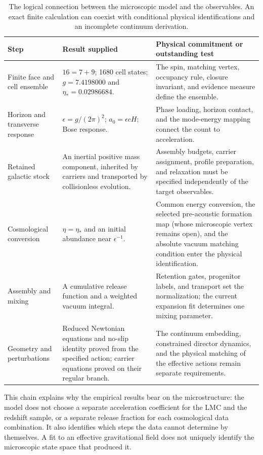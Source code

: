 \begin{table}[htbp]
\small
\begin{tabularx}{\textwidth}{P{.24\textwidth}YY}
\toprule
Step & Result supplied & Physical commitment or outstanding test \\
\midrule
Finite face and cell ensemble
& $16=7+9$; 1680 cell states; $g=7.4198000$ and $\eta_*=0.02986684$.
& The spin, matching vertex, occupancy rule, closure invariant, and
evidence measure define the ensemble. \\
Horizon and transverse response
& $\epsilon=g/(2\pi)^2$; $a_0=\epsilon cH$; Bose response.
& Phase loading, horizon contact, and the mode-energy mapping connect
the count to acceleration. \\
Retained galactic stock
& An inertial positive mass component, inherited by carriers and
transported by collisionless evolution.
& Assembly budgets, carrier assignment, profile preparation, and
relaxation must be specified independently of the target observables. \\
Cosmological conversion
& $\eta=\eta_*$ and an initial abundance near $\epsilon^{-1}$.
& Common energy conversion, the selected pre-acoustic formation map
(whose microscopic vertex remains open), and the absolute vacuum
matching condition enter the physical identification. \\
Assembly and mixing
& A cumulative release function and a weighted vacuum integral.
& Retention gates, progenitor labels, and transport set the normalization;
the current expansion fit determines one mixing parameter. \\
Geometry and perturbations
& Reduced Newtonian equations and no-slip identity proved from the
specified action; carrier equations proved on their regular branch.
& The continuum embedding, constrained director dynamics, and the
physical matching of the effective actions remain separate requirements. \\
\bottomrule
\end{tabularx}
\caption{The logical connection between the microscopic model and the
observables. An exact finite calculation can coexist with conditional
physical identifications and an incomplete continuum derivation.}
\end{table}

This chain explains why the empirical results bear on the microstructure:
the model does not choose a separate acceleration coefficient for the LMC
and the redshift sample, or a separate release fraction for each
cosmological data combination. It also identifies which steps the data
cannot determine by themselves. A fit to an effective gravitational field
does not uniquely identify the microscopic state space that produced it.

